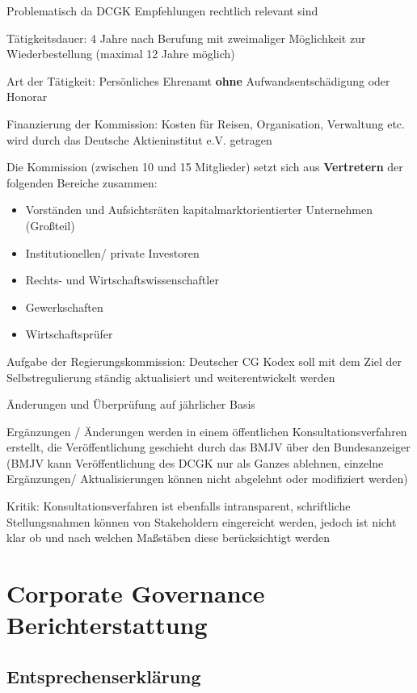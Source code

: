 \documentclass[
]{article}
\providecommand{\tightlist}{%
  \setlength{\itemsep}{0pt}\setlength{\parskip}{0pt}}
\begin{document}
Problematisch da DCGK Empfehlungen rechtlich relevant sind

Tätigkeitsdauer: 4 Jahre nach Berufung mit zweimaliger Möglichkeit zur
Wiederbestellung (maximal 12 Jahre möglich)

Art der Tätigkeit: Persönliches Ehrenamt \textbf{ohne}
Aufwandsentschädigung oder Honorar

Finanzierung der Kommission: Kosten für Reisen, Organisation, Verwaltung
etc. wird durch das Deutsche Aktieninstitut e.V. getragen

Die Kommission (zwischen 10 und 15 Mitglieder) setzt sich aus
\textbf{Vertretern} der folgenden Bereiche zusammen:

\begin{itemize}
\tightlist
\item
  Vorständen und Aufsichtsräten kapitalmarktorientierter Unternehmen
  (Großteil)
\item
  Institutionellen/ private Investoren
\item
  Rechts- und Wirtschaftswissenschaftler
\item
  Gewerkschaften
\item
  Wirtschaftsprüfer
\end{itemize}

Aufgabe der Regierungskommission: Deutscher CG Kodex soll mit dem Ziel
der Selbstregulierung ständig aktualisiert und weiterentwickelt werden

Änderungen und Überprüfung auf jährlicher Basis

Ergänzungen / Änderungen werden in einem öffentlichen
Konsultationsverfahren erstellt, die Veröffentlichung geschieht durch
das BMJV über den Bundesanzeiger (BMJV kann Veröffentlichung des DCGK
nur als Ganzes ablehnen, einzelne Ergänzungen/ Aktualisierungen können
nicht abgelehnt oder modifiziert werden)

Kritik: Konsultationsverfahren ist ebenfalls intransparent, schriftliche
Stellungsnahmen können von Stakeholdern eingereicht werden, jedoch ist
nicht klar ob und nach welchen Maßstäben diese berücksichtigt werden

\hypertarget{corporate-governance-berichterstattung}{%
\section{Corporate Governance
Berichterstattung}\label{corporate-governance-berichterstattung}}

\hypertarget{entsprechenserkluxe4rung}{%
\subsection{Entsprechenserklärung}\label{entsprechenserkluxe4rung}}
\end{document}
